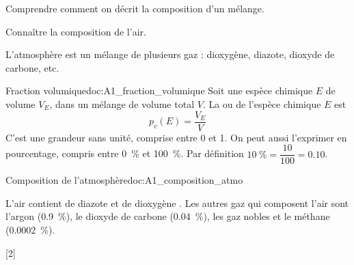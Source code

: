 \teteSndCorp

\vspace*{-36pt}


\begin{objectifs}
  \item Comprendre comment on décrit la composition d'un mélange.
  \item Connaître la composition de l'air.
\end{objectifs}

\begin{contexte}
  L'atmosphère est un mélange de plusieurs gaz : dioxygène, diazote, dioxyde de carbone, etc.
  
\end{contexte}


\begin{doc}{Fraction volumique}{doc:A1_fraction_volumique}
  Soit une espèce chimique $E$ de volume $V_E$, dans un mélange de volume total $V$.
  La  ou  de l'espèce chimique $E$ est
  \begin{equation*}
    p_{v}(E) = \frac{V_E}{V}
  \end{equation*}
  C'est une grandeur sans unité, comprise entre 0 et 1.
  On peut aussi l'exprimer en pourcentage, compris entre \qty{0}{\percent} et \qty{100}{\percent}.
  Par définition $\qty{10}{\percent} = \dfrac{10}{100} = \num{0,10}$.
\end{doc}

\begin{doc}{Composition de l'atmosphère}{doc:A1_composition_atmo}
  \begin{importants}
    L’air contient  de diazote  et  de dioxygène .
    Les autres gaz qui composent l’air sont l’argon  (\qty{0,9}{\percent}),
    le dioxyde de carbone  (\qty{0,04}{\percent}),
    les gaz nobles et le méthane  (\qty{0,0002}{\percent}).
  \end{importants}
\end{doc}


[2]

